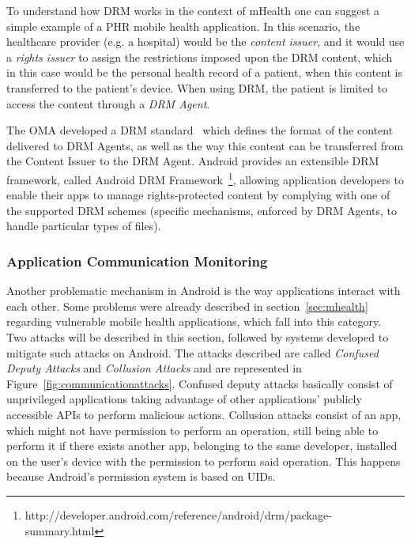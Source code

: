 To understand how \ac{DRM} works in the context of mHealth one can suggest a simple example of a \ac{PHR} mobile health application. In this scenario, the healthcare provider (e.g. a hospital) would be the \emph{content issuer}, and it would use a \emph{rights issuer} to assign the restrictions imposed upon the \ac{DRM} content, which in this case would be the personal health record of a patient, when this content is transferred to the patient's device. When using \ac{DRM}, the patient is limited to access the content through a \emph{\ac{DRM} Agent}.

The \ac{OMA} developed a DRM standard~\cite{drm} which defines the format of the content delivered to DRM Agents, as well as the way this content can be transferred from the Content Issuer to the DRM Agent. Android provides an extensible DRM framework, called Android DRM Framework~\footnote{http://developer.android.com/reference/android/drm/package-summary.html}, allowing application developers to enable their apps to manage rights-protected content by complying with one of the supported DRM schemes (specific mechanisms, enforced by DRM Agents, to handle particular types of files).

\subsubsection{Application Communication Monitoring}

Another problematic mechanism in Android is the way applications interact with each other. Some problems were already described in section~\ref{sec:mhealth} regarding vulnerable mobile health applications, which fall into this category. Two attacks will be described in this section, followed by systems developed to mitigate such attacks on Android. The attacks described are called \emph{Confused Deputy Attacks} and \emph{Collusion Attacks} and are represented in Figure~\ref{fig:communicationattacks}. Confused deputy attacks basically consist of unprivileged applications taking advantage of other applications’ publicly accessible APIs to perform malicious actions. Collusion attacks consist of an app, which might not have permission to perform an operation, still being able to perform it if there exists another app, belonging to the same developer, installed on the user’s device with the permission to perform said operation. This happens because Android’s permission system is based on UIDs.

